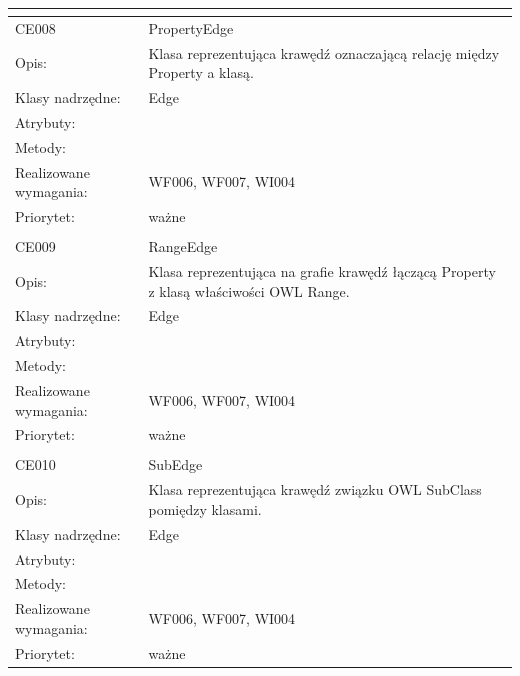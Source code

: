 \documentclass[a4paper,10pt]{article}
\begin{document}
\begin{center}
\begin{longtable}{|m{3cm}|m{9cm}|}
\multicolumn{2}{c}{} \\
 \hline

CE008 & PropertyEdge \\ \hline
Opis: &  Klasa reprezentująca krawędź oznaczającą relację między Property a klasą.   \\ \hline
Klasy nadrzędne: & Edge    \\ \hline
Atrybuty: & %
 \\ \hline
Metody: & %
  \\ \hline
Realizowane wymagania: & WF006, WF007, WI004 \\ \hline
Priorytet: & ważne  \\ \hline

\multicolumn{2}{c}{} \\
 \hline

CE009 & RangeEdge \\ \hline
Opis: & Klasa reprezentująca na grafie krawędź łączącą Property z klasą właściwości OWL Range.     \\ \hline
Klasy nadrzędne: & Edge    \\ \hline
Atrybuty: & %
 \\ \hline
Metody: & %
  \\ \hline
Realizowane wymagania: & WF006, WF007, WI004 \\ \hline
Priorytet: & ważne  \\ \hline

\multicolumn{2}{c}{} \\
 \hline

CE010 & SubEdge \\ \hline
Opis: & Klasa reprezentująca krawędź związku OWL SubClass pomiędzy klasami.   \\ \hline
Klasy nadrzędne: & Edge    \\ \hline
Atrybuty: & %
 \\ \hline
Metody: & %
  \\ \hline
Realizowane wymagania: & WF006, WF007, WI004 \\ \hline
Priorytet: & ważne  \\ \hline


\end{longtable}
\end{center}
\end{document}
